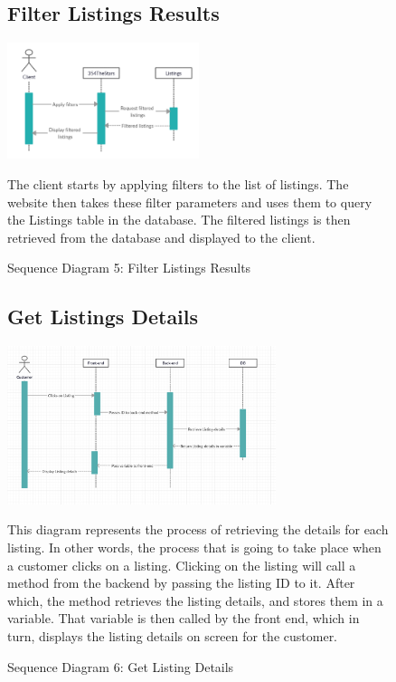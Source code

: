 \documentclass[11pt]{article}
\newcounter{use case ID}
\begin{document}
\begin{figure}[ht!]
    \subsection{Filter Listings Results}
    \centering
    \includegraphics[width=0.5\textwidth,height=0.15\paperheight]{Diagrams/Sequence/Filter_Listings.jpg}
    \caption{Sequence Diagram 5: Filter Listings Results}
    \label{fig: Filter Listings Results}
    \begin{justify}
        The client starts by applying filters to the list of listings. The website then takes these filter parameters and uses them to query the Listings table in the database. The filtered listings is then retrieved from the database and displayed to the client.
    \end{justify}
\end{figure}

\begin{figure}[ht!]
    \subsection{Get Listings Details}
    \centering
    \includegraphics[width=0.7\textwidth,height=0.25\paperheight]{Diagrams/Sequence/Listing_Details.png}
    \caption{Sequence Diagram 6: Get Listing Details}
    \label{fig: Get Listing Details}
    \begin{justify}
        This diagram represents the process of retrieving the details for each listing. In other words, the process that is going to take place when a customer clicks on a listing. Clicking on the listing will call a method from the backend by passing the listing ID to it. After which, the method retrieves the listing details, and stores them in a variable. That variable is then called by the front end, which in turn, displays the listing details on screen for the customer.
    \end{justify}
\end{figure}
\end{document}

